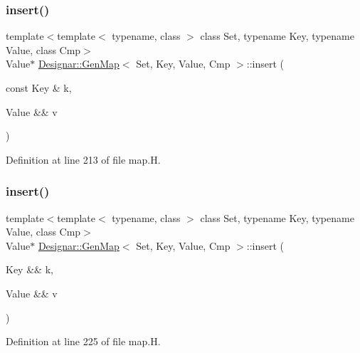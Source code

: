 \subsubsection{\texorpdfstring{insert()}{insert()}\hspace{0.1cm}{\footnotesize\ttfamily [3/4]}}
{\footnotesize\ttfamily template$<$template$<$ typename, class $>$ class Set, typename Key, typename Value, class Cmp$>$ \\
Value$\ast$ \hyperlink{class_designar_1_1_gen_map}{Designar\+::\+Gen\+Map}$<$ Set, Key, Value, Cmp $>$\+::insert (\begin{DoxyParamCaption}\item[{const Key \&}]{k,  }\item[{Value \&\&}]{v }\end{DoxyParamCaption})\hspace{0.3cm}{\ttfamily [inline]}}



Definition at line 213 of file map.\+H.

\mbox{\label{class_designar_1_1_gen_map_a514311c4192292ff816931e0c42f929f}} 
\subsubsection{\texorpdfstring{insert()}{insert()}\hspace{0.1cm}{\footnotesize\ttfamily [4/4]}}
{\footnotesize\ttfamily template$<$template$<$ typename, class $>$ class Set, typename Key, typename Value, class Cmp$>$ \\
Value$\ast$ \hyperlink{class_designar_1_1_gen_map}{Designar\+::\+Gen\+Map}$<$ Set, Key, Value, Cmp $>$\+::insert (\begin{DoxyParamCaption}\item[{Key \&\&}]{k,  }\item[{Value \&\&}]{v }\end{DoxyParamCaption})\hspace{0.3cm}{\ttfamily [inline]}}



Definition at line 225 of file map.\+H.

\mbox{\label{class_designar_1_1_gen_map_a994a7afc52e7421661f2eed7c03e6ae7}} 
